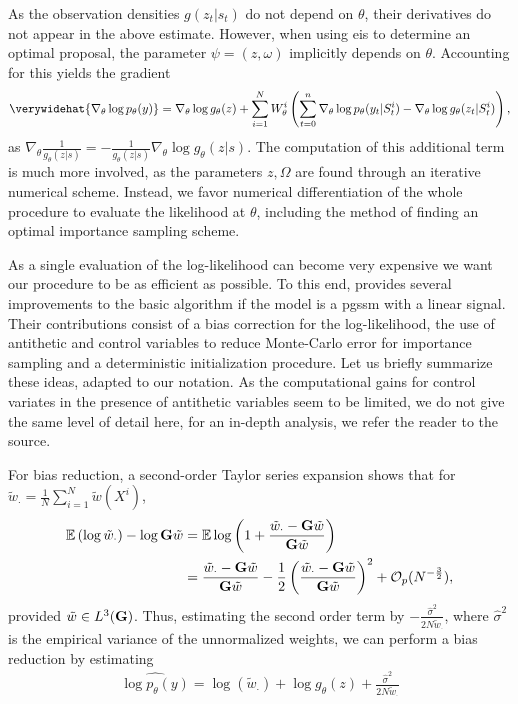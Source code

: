 As the observation densities $g(z_{t}|s_{t})$ do not depend on $\theta$, their derivatives do not appear in the above estimate. However, when using \acrshort{eis} to determine an optimal proposal, the parameter $\psi = (z, \omega)$ implicitly depends on $\theta$. Accounting for this yields the gradient 
$$
    \verywidehat{\nabla_{\theta} \log p_{\theta}(y)} = \nabla_{\theta} \log g_{\theta}(z) + \sum_{i=1}^N W^{i}_\theta \left(\sum_{t = 0}^n \nabla_{\theta} \log p_{\theta}(y_{t}|S_{t}^{i}) - \nabla_{\theta} \log g_{\theta}(z_{t}|S^{i}_{t})\right),
$$
as $\nabla_{\theta} \frac{1}{g_{\theta}(z|s)} = - \frac{1}{g_{\theta}(z|s)} \nabla_{\theta} \log g_{\theta}(z|s)$. The computation of this additional term is much more involved, as the parameters $z,\Omega$ are found through an iterative numerical scheme. Instead, we favor numerical differentiation of the whole procedure to evaluate the likelihood at $\theta$, including the method of finding an optimal importance sampling scheme. 


As a single evaluation of the log-likelihood can become very expensive we want our procedure to be as efficient as possible. To this end, \citep{Durbin1997Monte} provides several improvements to the basic algorithm if the model is a \acrshort{pgssm} with a linear signal. Their contributions consist of a bias correction for the log-likelihood, the use of antithetic and control variables to reduce Monte-Carlo error for importance sampling and a deterministic initialization procedure.
Let us briefly summarize these ideas, adapted to our notation. As the computational gains for control variates in the presence of antithetic variables seem to be limited, we do not give the same level of detail here, for an in-depth analysis, we refer the reader to the source. 

For bias reduction, a second-order Taylor series expansion shows that for $\tilde{w}_\cdot = \frac{1}{N} \sum_{i =1}^N \tilde w(X^{i})$,
\begin{align*}
    \mathbb E \left(\log \tilde{w}_\cdot\right) - \log \mathbf G \tilde w &= \mathbb E \log \left(1 + \frac{\tilde{w}_\cdot - \mathbf G \tilde w}{\mathbf G \tilde w} \right)\\
                                                           &=  \frac{\tilde{w}_\cdot - \mathbf G \tilde w}{\mathbf G \tilde w}  - \frac{1}{2} \left(\frac{\tilde{w}_\cdot - \mathbf G \tilde w}{\mathbf G \tilde w} \right)^{2} + \mathcal O_{p}(N^{-\frac{3}{2}}),
\end{align*}
provided $\tilde w \in L^{3}(\mathbf G)$. Thus, estimating the second order term by $- \frac{\hat\sigma^2}{2N \tilde{w}_\cdot} $, where $\hat \sigma^{2}$ is the empirical variance of the unnormalized weights, we can perform a bias reduction by estimating 
\begin{align}
    \label{eq:loglik-hat-bias-reduction}
    \widehat{\log p_{\theta}(y)} = \log \left(\tilde w_{\cdot}\right) + \log g_{\theta}(z) + \frac{\hat\sigma^{2}}{2N\tilde w_{\cdot}}
\end{align}

